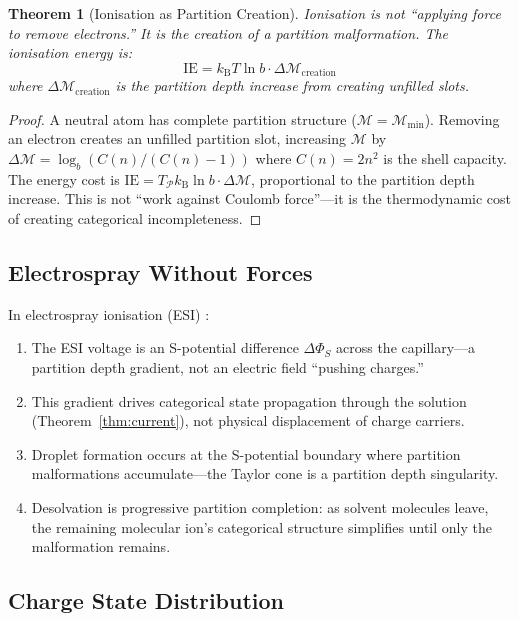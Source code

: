 \documentclass[11pt,twocolumn,a4paper]{article}
\newtheorem{theorem}{Theorem}[section]
\theoremstyle{definition}
\theoremstyle{remark}
\newcommand{\kB}{k_{\mathrm{B}}}
\newcommand{\Depth}{\mathcal{M}}
\newcommand{\Spotential}{\Phi_S}
\begin{document}
\begin{theorem}[Ionisation as Partition Creation]
\label{thm:ionisation}
Ionisation is not ``applying force to remove electrons.'' It is the creation of a partition malformation. The ionisation energy is:
\begin{equation}
\mathrm{IE} = \kB T \ln b \cdot \Delta\Depth_{\mathrm{creation}}
\end{equation}
where $\Delta\Depth_{\mathrm{creation}}$ is the partition depth increase from creating unfilled slots.
\end{theorem}

\begin{proof}
A neutral atom has complete partition structure ($\Depth = \Depth_{\min}$). Removing an electron creates an unfilled partition slot, increasing $\Depth$ by $\Delta\Depth = \log_b(C(n)/(C(n)-1))$ where $C(n) = 2n^2$ is the shell capacity. The energy cost is $\mathrm{IE} = T_{\mathcal{P}}\kB\ln b \cdot \Delta\Depth$, proportional to the partition depth increase. This is not ``work against Coulomb force''---it is the thermodynamic cost of creating categorical incompleteness.
\end{proof}

\subsection{Electrospray Without Forces}

In electrospray ionisation (ESI) \citep{fenn1989}:

\begin{enumerate}[nosep]
\item The ESI voltage is an S-potential difference $\Delta\Spotential$ across the capillary---a partition depth gradient, not an electric field ``pushing charges.''
\item This gradient drives categorical state propagation through the solution (Theorem~\ref{thm:current}), not physical displacement of charge carriers.
\item Droplet formation occurs at the S-potential boundary where partition malformations accumulate---the Taylor cone is a partition depth singularity.
\item Desolvation is progressive partition completion: as solvent molecules leave, the remaining molecular ion's categorical structure simplifies until only the malformation remains.
\end{enumerate}

\subsection{Charge State Distribution}
\end{document}
